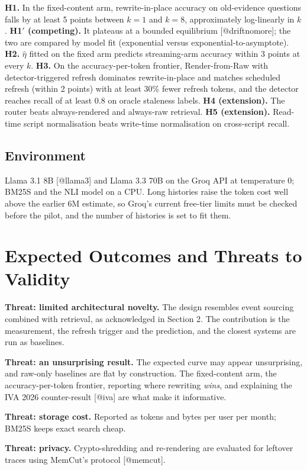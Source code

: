 \textbf{H1.} In the fixed-content arm, rewrite-in-place accuracy on old-evidence questions falls by at least 5 points between $k = 1$ and $k = 8$, approximately log-linearly in $k$. \textbf{H1$'$ (competing).} It plateaus at a bounded equilibrium [@driftnomore]; the two are compared by model fit (exponential versus exponential-to-asymptote). \textbf{H2.} $\hat\eta$ fitted on the fixed arm predicts streaming-arm accuracy within 3 points at every $k$. \textbf{H3.} On the accuracy-per-token frontier, Render-from-Raw with detector-triggered refresh dominates rewrite-in-place and matches scheduled refresh (within 2 points) with at least 30\% fewer refresh tokens, and the detector reaches recall of at least 0.8 on oracle staleness labels. \textbf{H4 (extension).} The router beats always-rendered and always-raw retrieval. \textbf{H5 (extension).} Read-time script normalisation beats write-time normalisation on cross-script recall.

\subsection{Environment}
Llama 3.1 8B [@llama3] and Llama 3.3 70B on the Groq API at temperature 0; BM25S and the NLI model on a CPU. Long histories raise the token cost well above the earlier 6M estimate, so Groq's current free-tier limits must be checked before the pilot, and the number of histories is set to fit them.

\section{Expected Outcomes and Threats to Validity}

\textbf{Threat: limited architectural novelty.} The design resembles event sourcing combined with retrieval, as acknowledged in Section 2. The contribution is the measurement, the refresh trigger and the prediction, and the closest systems are run as baselines.

\textbf{Threat: an unsurprising result.} The expected curve may appear unsurprising, and raw-only baselines are flat by construction. The fixed-content arm, the accuracy-per-token frontier, reporting where rewriting \textit{wins}, and explaining the IVA 2026 counter-result [@iva] are what make it informative.

\textbf{Threat: storage cost.} Reported as tokens and bytes per user per month; BM25S keeps exact search cheap.

\textbf{Threat: privacy.} Crypto-shredding and re-rendering are evaluated for leftover traces using MemCut's protocol [@memcut].

